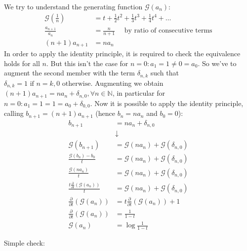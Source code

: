 We try to understand the generating function $\mathcal{G}(a_n) $:
\begin{displaymath}
  \begin{split}
    \mathcal{G} ( \frac{1}{n} ) &= t + \frac{1}{2} t^2 +  \frac{1}{3}
    t^3 +  \frac{1}{4} t^4 + \ldots \\
     \frac{a_{n+1}}{a_n} &=  \frac{n}{n+1} \quad \text{ by ratio of
       consecutive terms}\\
      (n+1)a_{n+1}  &= n a_n
  \end{split}
\end{displaymath}
In order to apply the identity principle, it is required to check the
equivalence holds for all $n$. But this isn't the case for $n=0:a_{1}
= 1 \not = 0 = a_0$. So we've to augment the second member with the
term $\delta_{n,k}$ such that $\delta_{n,k} = 1 \text{ if } n=k, 0
\text{ otherwise}$. Augmenting we obtain $(n+1)a_{n+1} = n a_n +
\delta_{n,0}, \forall n \in \mathbb{N} $, in particular for $n=0:a_{1}
= 1 = 1 = a_0 + \delta_{0,0}$. Now it is possible to apply the
identity principle, calling $b_{n+1} = (n+1)a_{n+1}$ (hence $b_n =n
a_n$ and $b_0 = 0$):
\begin{displaymath}
  \begin{split}
    b_{n+1} &= n a_n + \delta_{n,0} \\
    &\downarrow \\
    \mathcal{G} (b_{n+1}) &= \mathcal{G} (n a_n) + \mathcal{G}
    (\delta_{n,0}) \\
    \frac{\mathcal{G} (b_n) - b_0}{t} &= \mathcal{G} (n a_n) +
    \mathcal{G}
    (\delta_{n,0}) \\
    \frac{\mathcal{G} (n a_n)}{t} &= \mathcal{G} (n a_n) + \mathcal{G}
    (\delta_{n,0}) \\
    \frac{t \frac{\partial}{\partial t}\left( \mathcal{G} (a_n)
      \right) }{t} &= \mathcal{G} (n a_n) + \mathcal{G}
    (\delta_{n,0}) \\
    \frac{\partial}{\partial t}\left( \mathcal{G} (a_n) \right) &= t
    \frac{\partial}{\partial t}\left( \mathcal{G} (a_n) \right) + 1 \\
    \frac{\partial}{\partial t}\left( \mathcal{G} (a_n) \right) &=
    \frac{1}{1-t}\\
    \mathcal{G} (a_n) &= \log{ \frac{1}{1-t} }
  \end{split}
\end{displaymath}

Simple check:


